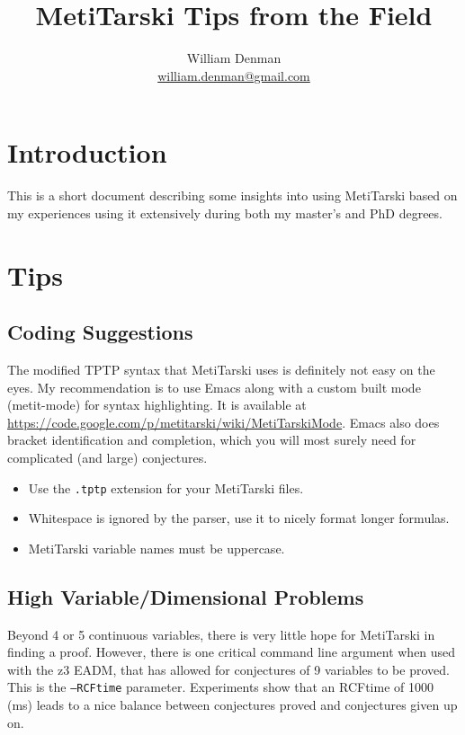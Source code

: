 \documentclass[11pt]{article}   	%
\title{MetiTarski Tips from the Field}
\author{William Denman \\ \url{william.denman@gmail.com}}
\begin{document}
\maketitle

\section{Introduction}

This is a short document describing some insights into using MetiTarski based on
my experiences using it extensively during both my master's and PhD degrees.

\section{Tips}

\subsection{Coding Suggestions}

The modified TPTP syntax that MetiTarski uses is definitely not easy on the
eyes. My recommendation is to use Emacs along with a custom built mode
(metit-mode) for syntax highlighting. It is available at
\url{https://code.google.com/p/metitarski/wiki/MetiTarskiMode}. Emacs also does bracket identification and completion, which you will most surely need for complicated (and large) conjectures. 

\begin{itemize}
  \item Use the \texttt{.tptp} extension for your MetiTarski files.

\item Whitespace is ignored by the parser, use it to nicely format longer formulas.

\item MetiTarski variable names must be uppercase.
\end{itemize}


\subsection{High Variable/Dimensional Problems}

Beyond 4 or 5 continuous variables, there is very little hope for MetiTarski in
finding a proof. However, there is one critical command line argument when used
with the z3 EADM, that has allowed for conjectures of 9 variables to be
proved. This is the \texttt{--RCFtime} parameter. Experiments show that an RCFtime of
1000 (ms) leads to a nice balance between conjectures proved and conjectures
given up on.
\end{document}
